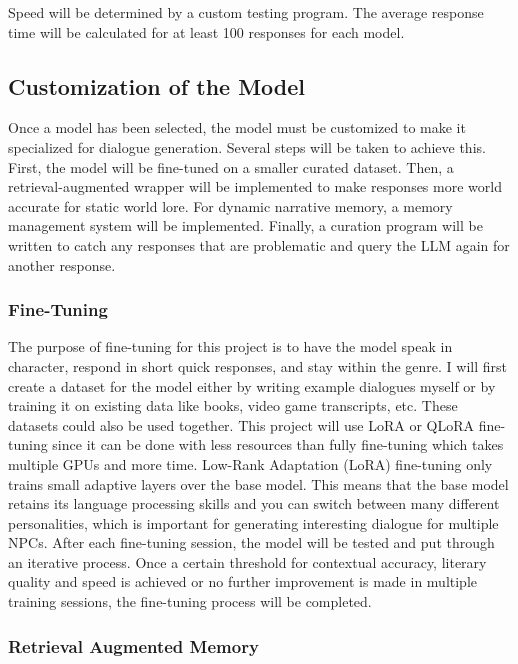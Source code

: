 \documentclass[10pt,twocolumn]{article}
\begin{document}
            \par 
            Speed will be determined by a custom testing program. The average response time will be calculated for at least 100 responses for each model.

    \subsection{Customization of the Model}

        \par 
        Once a model has been selected, the model must be customized to make it specialized for dialogue generation. Several steps will be taken to achieve this. First, the model will be fine-tuned on a smaller curated dataset. Then, a retrieval-augmented wrapper will be implemented to make responses more world accurate for static world lore. For dynamic narrative memory, a memory management system will be implemented. Finally, a curation program will be written to catch any responses that are problematic and query the LLM again for another response. 

        \subsubsection{Fine-Tuning}

            \par 
            The purpose of fine-tuning for this project is to have the model speak in character, respond in short quick responses, and stay within the genre. I will first create a dataset for the model either by writing example dialogues myself or by training it on existing data like books, video game transcripts, etc. These datasets could also be used together. This project will use LoRA or QLoRA fine-tuning since it can be done with less resources than fully fine-tuning which takes multiple GPUs and more time. Low-Rank Adaptation (LoRA) fine-tuning only trains small adaptive layers over the base model. This means that the base model retains its language processing skills and you can switch between many different personalities, which is important for generating interesting dialogue for multiple NPCs. After each fine-tuning session, the model will be tested and put through an iterative process. Once a certain threshold for contextual accuracy, literary quality and speed is achieved or no further improvement is made in multiple training sessions, the fine-tuning process will be completed. 

        \subsubsection{Retrieval Augmented Memory}
\end{document}
